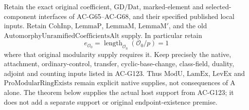 Retain the exact original coefficient, \(\mathrm{GD}/\mathrm{Dat}\),
marked-element and selected-component interfaces of AC-G65--AC-G68,
and their specified published local inputs.  Retain
\(\mathrm{CohInp}\), \(\mathrm{LemmaP}\),
\(\mathrm{LemmaM}\), \(\mathrm{LemmaM'}\), and the old
\(\mathrm{AutomorphyUnramifiedCoefficientsAlt}\) supply.  In
particular retain
\[
 e_{\mathcal O_0}
       =\operatorname{length}_{\mathcal O_0}(\mathcal O_0/p)=1
 \tag{G124.5}
\]
where that original modularity supply requires it.
Keep precisely the native, attachment, ordinary-control, transfer,
cyclic-base-change, class-field, duality, adjoint and counting inputs
listed in AC-G123.  Thus \(\mathrm{ModU}\), \(\mathrm{LamEx}\),
\(\mathrm{LevEx}\) and \(\mathrm{ProModularRingExists}\) remain
explicit native supplies, not consequences of A alone.
The theorem below supplies the actual host support from AC-G123; it
does not add a separate support or original endpoint-existence premise.

